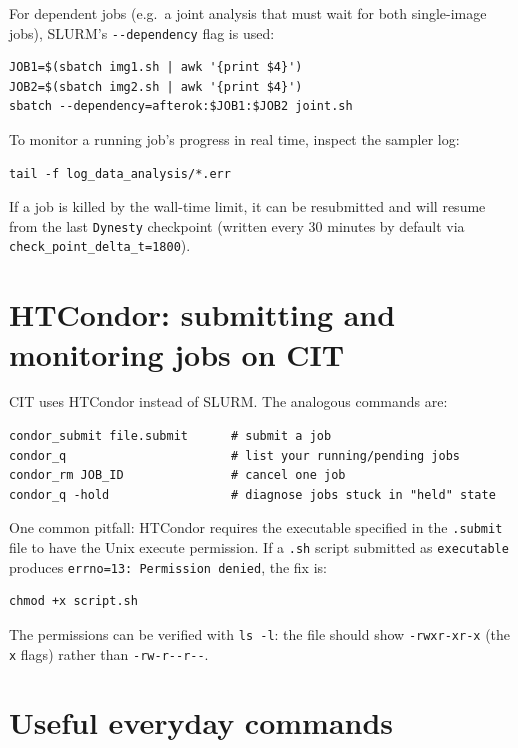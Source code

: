 For dependent jobs (e.g.\ a joint analysis that must wait for both single-image jobs), SLURM's \texttt{-{}-dependency} flag is used:

\begin{verbatim}
JOB1=$(sbatch img1.sh | awk '{print $4}')
JOB2=$(sbatch img2.sh | awk '{print $4}')
sbatch --dependency=afterok:$JOB1:$JOB2 joint.sh
\end{verbatim}

To monitor a running job's progress in real time, inspect the sampler log:

\begin{verbatim}
tail -f log_data_analysis/*.err
\end{verbatim}

If a job is killed by the wall-time limit, it can be resubmitted and will resume from the last \texttt{Dynesty} checkpoint (written every 30 minutes by default via \texttt{check\_point\_delta\_t=1800}).

\section{HTCondor: submitting and monitoring jobs on CIT}

CIT uses HTCondor instead of SLURM. The analogous commands are:

\begin{verbatim}
condor_submit file.submit      # submit a job
condor_q                       # list your running/pending jobs
condor_rm JOB_ID               # cancel one job
condor_q -hold                 # diagnose jobs stuck in "held" state
\end{verbatim}

One common pitfall: HTCondor requires the executable specified in the \texttt{.submit} file to have the Unix execute permission. If a \texttt{.sh} script submitted as \texttt{executable} produces \texttt{errno=13: Permission denied}, the fix is:

\begin{verbatim}
chmod +x script.sh
\end{verbatim}

The permissions can be verified with \texttt{ls -l}: the file should show \texttt{-rwxr-xr-x} (the \texttt{x} flags) rather than \texttt{-rw-r-{}-r-{}-}.

\section{Useful everyday commands}

